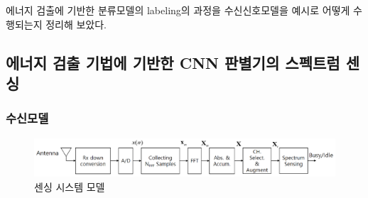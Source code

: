     에너지 검출에 기반한 분류모델의 labeling의 과정을 수신신호모델을 예시로 어떻게 수행되는지 정리해 보았다.
\subsection{에너지 검출 기법에 기반한 CNN 판별기의 스펙트럼 센싱}
\subsubsection*{수신모델}
    \begin{figure}[!h]\centering
		\includegraphics[width=.7\textwidth]{image/week04/4-2.png}
		\caption{ 센싱 시스템 모델 }
		\vspace{-10pt}
    \end{figure}
